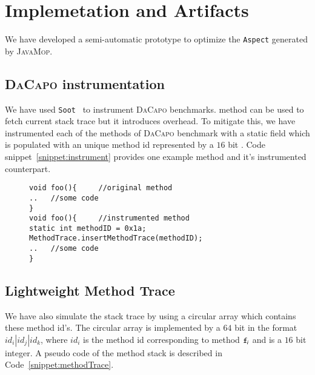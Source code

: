 \section{Implemetation and Artifacts}
\label{sec:implementation}

We have developed a semi-automatic prototype to optimize the \texttt{Aspect}
generated by \textsc{JavaMop}.



\subsection{\textsc{DaCapo} instrumentation} 
\label{subsec:dacapoInstr}

We have used \texttt{Soot}~\cite{soot} to
instrument \textsc{DaCapo} benchmarks.  method can be used to
fetch current stack trace but it introduces overhead. To mitigate this, we have
instrumented each of the methods of \textsc{DaCapo} benchmark with a static
 field which is populated with an unique method id represented by
a $16$ bit . Code snippet~\ref{snippet:instrument} provides one
example method and it's instrumented counterpart.

 \begin{figure}[t]
\begin{lstlisting}
void foo(){		//original method
..   //some code
}
void foo(){		//instrumented method
static int methodID = 0x1a;
MethodTrace.insertMethodTrace(methodID);
..   //some code
}
\end{lstlisting}
\end{figure}

\subsection{Lightweight Method Trace}
\label{subsec:trace}

We have also simulate the stack trace by using a
circular array which contains these method id's. The circular array is
implemented by a $64$ bit  in the format $id_i|id_j|id_k$, where
$id_i$ is the method id corresponding to method $\code{f}_i$ and is a $16$ bit
integer. A pseudo code of the method stack is described in
Code~\ref{snippet:methodTrace}.

